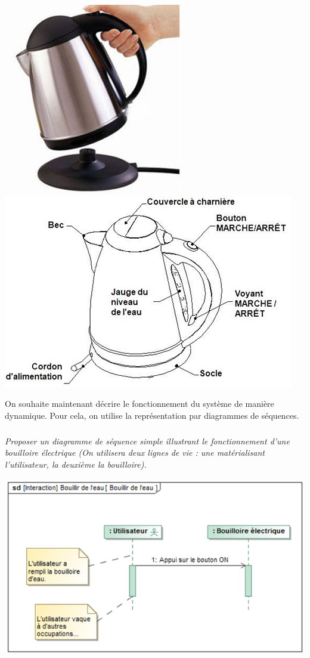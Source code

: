 \documentclass[10pt]{article}
\begin{document}
\begin{minipage}[c]{.3\linewidth}
\begin{center}
\includegraphics[width=.7\textwidth]{images/bouilloire_01}
\includegraphics[width=\textwidth]{images/bouilloire_02}
\end{center}
\end{minipage}

On souhaite maintenant décrire le fonctionnement du système de manière dynamique. Pour cela, on utilise la représentation par diagrammes de séquences.

\subparagraph{}
\textit{Proposer un diagramme de séquence simple illustrant le fonctionnement d’une bouilloire électrique (On utilisera deux lignes de vie : une matérialisant l’utilisateur, la deuxième la bouilloire).}
\begin{center}
\includegraphics[width=.7\textwidth]{images/bouilloire_03}
\end{center}
\end{document}
